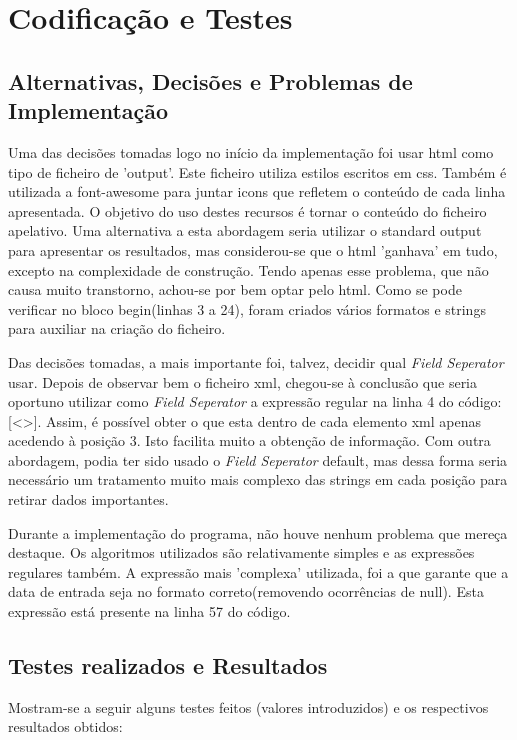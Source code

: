 \documentclass{report}
\def\fs{\emph{Field Seperator}\xspace}
\begin{document}
\chapter{Codificação e Testes} \label{ct}
\section{Alternativas, Decisões e Problemas de Implementação}
Uma das decisões tomadas logo no início da implementação foi usar html como tipo de ficheiro de 'output'.
Este ficheiro utiliza estilos escritos em css. 
Também é utilizada a font-awesome para juntar icons que refletem o conteúdo de cada linha apresentada. 
O objetivo do uso destes recursos é tornar o conteúdo do ficheiro apelativo.
Uma alternativa a esta abordagem seria utilizar o standard output para
apresentar os resultados, mas considerou-se que o html 'ganhava' em tudo, 
excepto na complexidade de construção. Tendo apenas esse problema, que não
causa muito transtorno, achou-se por bem optar pelo html.
Como se pode verificar no bloco begin(linhas 3 a 24), foram criados vários formatos e strings para auxiliar na criação do ficheiro.\par
Das decisões tomadas, a mais importante foi, talvez, decidir qual \fs usar. Depois de observar bem o ficheiro xml, chegou-se à 
conclusão que seria oportuno utilizar como \fs a expressão regular na linha 4 do código: [\textless\textgreater]. Assim, é possível obter o que esta dentro de cada elemento xml apenas acedendo à posição 3. Isto facilita muito a obtenção de informação.
Com outra abordagem, podia ter sido usado o \fs default, mas dessa
forma seria necessário um tratamento muito mais complexo das strings
em cada posição para retirar dados importantes. \par
Durante a implementação do programa, não houve nenhum problema que mereça 
destaque. Os algoritmos utilizados são relativamente simples e as 
expressões regulares também. A expressão mais 'complexa' utilizada, foi a 
que garante que a data de entrada seja no formato correto(removendo ocorrências de null). Esta expressão está presente na linha 57 do código.


\section{Testes realizados e Resultados}
Mostram-se a seguir alguns testes feitos (valores introduzidos) e
os respectivos resultados obtidos:
\end{document}
